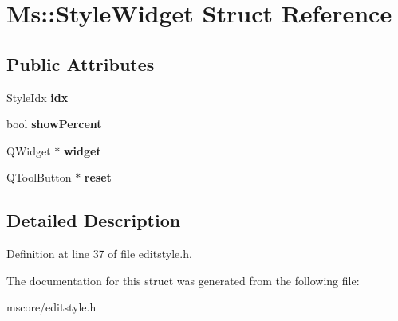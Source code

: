 \hypertarget{struct_ms_1_1_style_widget}{}\section{Ms\+:\+:Style\+Widget Struct Reference}
\label{struct_ms_1_1_style_widget}
\subsection*{Public Attributes}
\begin{DoxyCompactItemize}
\item 
\mbox{\label{struct_ms_1_1_style_widget_ac40834b56569bc3b1adbbd3e3166aaeb}} 
Style\+Idx {\bfseries idx}
\item 
\mbox{\label{struct_ms_1_1_style_widget_a339a15ff6858c8cee3fbcb06adfee686}} 
bool {\bfseries show\+Percent}
\item 
\mbox{\label{struct_ms_1_1_style_widget_aba22476b0b02d91e9dde2736751abf5b}} 
Q\+Widget $\ast$ {\bfseries widget}
\item 
\mbox{\label{struct_ms_1_1_style_widget_ab0870405420687d0d841f2a6bc6e6ee1}} 
Q\+Tool\+Button $\ast$ {\bfseries reset}
\end{DoxyCompactItemize}


\subsection{Detailed Description}


Definition at line 37 of file editstyle.\+h.



The documentation for this struct was generated from the following file\+:\begin{DoxyCompactItemize}
\item 
mscore/editstyle.\+h\end{DoxyCompactItemize}
